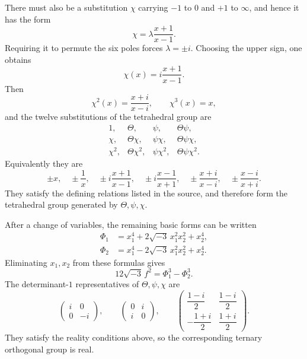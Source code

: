 \documentclass[11pt,a4paper]{book}
\begin{document}
There must also be a substitution $\chi$ carrying $-1$ to $0$ and $+1$ to $\infty$, and hence it has the form
\begin{equation}\label{eq:w9-chi}
 \chi=\lambda\frac{x+1}{x-1}.
\end{equation}
Requiring it to permute the six poles forces $\lambda=\pm i$.  Choosing the upper sign, one obtains
\[
 \chi(x)=i\frac{x+1}{x-1}.
\]
Then
\[
 \chi^2(x)=\frac{x+i}{x-i},
 \qquad \chi^3(x)=x,
\]
and the twelve substitutions of the tetrahedral group are
\begin{equation}\label{eq:w9-tet-list}
\begin{array}{cccc}
1,&\Theta,&\psi,&\Theta\psi,\\
\chi,&\Theta\chi,&\psi\chi,&\Theta\psi\chi,\\
\chi^2,&\Theta\chi^2,&\psi\chi^2,&\Theta\psi\chi^2.
\end{array}
\end{equation}
Equivalently they are
\begin{equation}\label{eq:w9-tet-explicit}
 \pm x,
 \quad \pm\frac1x,
 \quad \pm i\frac{x+1}{x-1},
 \quad \pm i\frac{x-1}{x+1},
 \quad \pm\frac{x+i}{x-i},
 \quad \pm\frac{x-i}{x+i}.
\end{equation}
They satisfy the defining relations listed in the source, and therefore form the tetrahedral group generated by $\Theta,\psi,\chi$.

After a change of variables, the remaining basic forms can be written
\begin{equation}\label{eq:w9-tet-Phi}
\begin{aligned}
 \Phi_1&=x_1^4+2\sqrt{-3}\,x_1^2x_2^2+x_2^4,\\
 \Phi_2&=x_1^4-2\sqrt{-3}\,x_1^2x_2^2+x_2^4.
\end{aligned}
\end{equation}
Eliminating $x_1,x_2$ from these formulas gives
\begin{equation}\label{eq:w9-tet-relation}
 12\sqrt{-3}\,f^2=\Phi_1^3-\Phi_2^3.
\end{equation}
The determinant-$1$ representatives of $\Theta,\psi,\chi$ are
\begin{equation}\label{eq:w9-tet-matrices}
\begin{pmatrix}i&0\\0&-i\end{pmatrix},
\qquad
\begin{pmatrix}0&i\\i&0\end{pmatrix},
\qquad
\begin{pmatrix}
\dfrac{1-i}{2}&\dfrac{1-i}{2}\\[4pt]
-\dfrac{1+i}{2}&\dfrac{1+i}{2}
\end{pmatrix}.
\end{equation}
They satisfy the reality conditions above, so the corresponding ternary orthogonal group is real.
\end{document}
